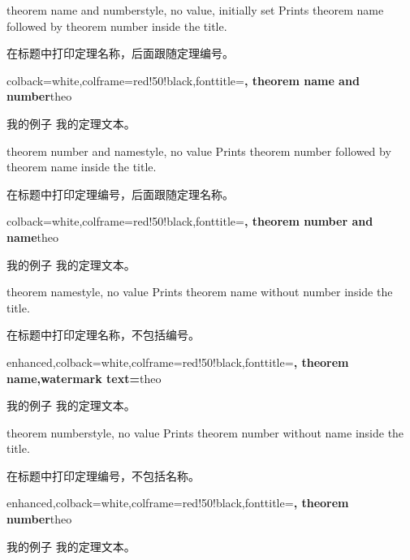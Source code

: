 \begin{docTcbKey}{theorem name and number}{}{style, no value, initially set}
Prints theorem name followed by theorem number inside the title.

在标题中打印定理名称，后面跟随定理编号。
\begin{dispExample}
%
  {colback=white,colframe=red!50!black,fonttitle=\bfseries,
   theorem name and number}{theo}
\begin{sometheorem}{我的例子}{}
我的定理文本。
\end{sometheorem}
\end{dispExample}
\end{docTcbKey}


\begin{docTcbKey}{theorem number and name}{}{style, no value}
Prints theorem number followed by theorem name inside the title.

在标题中打印定理编号，后面跟随定理名称。
\begin{dispExample}
%
  {colback=white,colframe=red!50!black,fonttitle=\bfseries,
   theorem number and name}{theo}
\begin{sometheorem}{我的例子}{}
我的定理文本。
\end{sometheorem}
\end{dispExample}
\end{docTcbKey}

\begin{docTcbKey}{theorem name}{}{style, no value}
Prints theorem name without number inside the title.

在标题中打印定理名称，不包括编号。
\begin{dispExample}
%
  {enhanced,colback=white,colframe=red!50!black,fonttitle=\bfseries,
   theorem name,watermark text={\thetcbcounter}}{theo}
\begin{sometheorem}{我的例子}{}
我的定理文本。
\end{sometheorem}
\end{dispExample}
\end{docTcbKey}


\begin{docTcbKey}[][doc new=2021-12-03]{theorem number}{}{style, no value}
Prints theorem number without name inside the title.

在标题中打印定理编号，不包括名称。
\begin{dispExample}
%
  {enhanced,colback=white,colframe=red!50!black,fonttitle=\bfseries,
   theorem number}{theo}
\begin{sometheorem}{我的例子}{}
我的定理文本。
\end{sometheorem}
\end{dispExample}
\end{docTcbKey}



